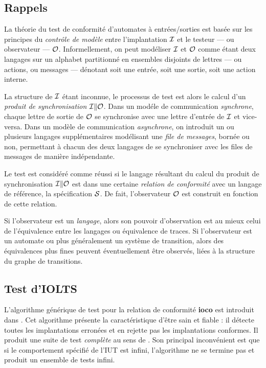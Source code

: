 \subsection{Rappels}

La th\'eorie du test de conformit\'e d'automates \`a
entr\'ees/sorties est bas\'ee sur les principes du \emph{contr\^ole
  de mod\`ele} entre l'implantation $\cal I$ et le testeur --- ou
observateur --- $\cal O$. Informellement,  on peut mod\'eliser
$\cal I$ et $\cal O$ comme \'etant deux
langages sur un alphabet partitionn\'e en ensembles disjoints de
lettres --- ou actions, ou messages --- d\'enotant soit une
entr\'ee, soit une sortie, soit une action interne. 

La structure de
$\cal I$ \'etant inconnue, le processus de test est alors 
le calcul d'un  \emph{produit de synchronisation} ${\cal I} \| {\cal
  O}$. Dans un mod\'ele de communication \emph{synchrone}, chaque lettre de
sortie de $\cal O$ se synchronise avec une lettre d'entr\'ee de $\cal
I$ et vice-versa. Dans un mod\`ele de communication \emph{asynchrone}, on
introduit un ou plusieurs langages suppl\'ementaires mod\'elisant une \emph{file de
messages}, born\'ee ou non, permettant \`a chacun des deux
langages de se synchroniser avec les files de messages de mani\`ere
ind\'ependante. 

Le test est consid\'er\'e comme r\'eussi si le langage r\'esultant
du calcul du produit de synchronisation ${\cal I} \| {\cal O}$ est dans
une certaine \emph{relation de conformit\'e} avec un langage de
r\'ef\'erence, la sp\'ecification $\cal S$. De fait, l'observateur
${\cal O}$ est construit en fonction de cette relation. 

Si l'observateur est un \emph{langage}, alors son pouvoir
d'observation est au mieux celui de l'\'equivalence entre les
langages ou \'equivalence de traces. Si l'observateur est un automate
ou plus g\'en\'eralement un syst\`eme de transition, alors des
\'equivalences plus fines peuvent \'eventuellement \^etre
observ\'es, li\'ees \`a la structure du graphe de transitions.

 

\subsection{Test d'\textsf{IOLTS}}

L'algorithme g\'en\'erique de test pour la relation de conformit\'e
\textbf{ioco} est introduit dans \cite{tgenioq}. Cet algorithme
pr\'esente la caract\'eristique d'\^etre sain et fiable : il
d\'etecte toutes les implantations erron\'ees et en rejette pas les
implantations conformes. Il produit une suite de test
\emph{compl\`ete} au sens de \cite{itu-z500}. Son principal inconv\'enient est que si le
comportement sp\'ecifi\'e de l'\textsf{IUT} est infini, l'algorithme
ne se termine pas et produit un ensemble de tests infini. 

